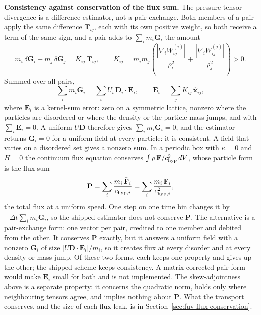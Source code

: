\textbf{Consistency against conservation of the flux sum.} The
pressure-tensor divergence is a difference estimator, not a pair
exchange. Both members of a pair apply the same difference
$\mathbf T_{ij}$, each with its own positive weight, so both receive a
term of the same sign, and a pair adds to $\sum_i m_i \mathbf G_i$ the
amount
\begin{equation}
  m_i\,\delta\mathbf G_i + m_j\,\delta\mathbf G_j
    = K_{ij}\,\mathbf T_{ij} ,
  \qquad
  K_{ij} = m_i m_j\left(\frac{|\nabla_i W_{ij}^{(i)}|}{\rho_i^2}
    + \frac{|\nabla_i W_{ij}^{(j)}|}{\rho_j^2}\right) > 0 .
  \label{eq:fuv-grad-pair-sum}
\end{equation}
Summed over all pairs,
\begin{equation}
  \sum_i m_i \mathbf G_i = \sum_i U_i\,\mathbf D_i\cdot\mathbf E_i ,
  \qquad
  \mathbf E_i = \sum_j K_{ij}\,\hat{\mathbf x}_{ij} ,
  \label{eq:fuv-grad-kernel-error}
\end{equation}
where $\mathbf E_i$ is a kernel-sum error: zero on a symmetric lattice,
nonzero where the particles are disordered or where the density or the
particle mass jumps, and with $\sum_i \mathbf E_i = 0$. A uniform
$U\mathbf D$ therefore gives $\sum_i m_i\mathbf G_i = 0$, and the
estimator returns $\mathbf G_i = 0$ for a uniform field at every
particle: it is consistent. A field that varies on a disordered set gives
a nonzero sum. In a periodic box with $\kappa = 0$ and $H = 0$ the
continuum flux equation conserves $\int \rho\,\mathbf F/c_{\rm hyp}^2\,dV$,
whose particle form is the flux sum
\begin{equation}
  \mathbf P = \sum_i \frac{m_i\,\tilde{\mathbf F}_i}{c_{{\rm hyp},i}}
            = \sum_i \frac{m_i\,\mathbf F_i}{c_{{\rm hyp},i}^2} ,
  \label{eq:fuv-flux-sum}
\end{equation}
the total flux at a uniform speed. One step on one time bin changes it
by $-\Delta t\sum_i m_i\mathbf G_i$, so the shipped estimator does not
conserve $\mathbf P$. The alternative is a pair-exchange form: one
vector per pair, credited to one member and debited from the other. It
conserves $\mathbf P$ exactly, but it answers a uniform field with a
nonzero $\mathbf G_i$ of size $|U\mathbf D\cdot\mathbf E_i|/m_i$, so it
creates flux at every disorder and at every density or mass jump. Of these two forms,
each keeps one property and gives up the other; the shipped scheme keeps
consistency. A matrix-corrected pair form would make $\mathbf E_i$ small
for both and is not implemented. The skew-adjointness above is a separate
property: it concerns the quadratic norm, holds only where neighbouring
tensors agree, and implies nothing about $\mathbf P$. What the transport
conserves, and the size of each flux leak, is in
Section~\ref{sec:fuv-flux-conservation}.

